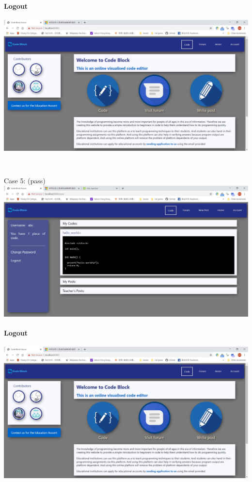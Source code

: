 \paragraph{Logout}

\includegraphics[scale=0.45]{Doc/Pics/logout}

~

Case 5: (pass)\\
\includegraphics[scale=0.45]{Doc/Pics/case-5-2-5}

\paragraph{Logout}

\includegraphics[scale=0.45]{Doc/Pics/logout}

